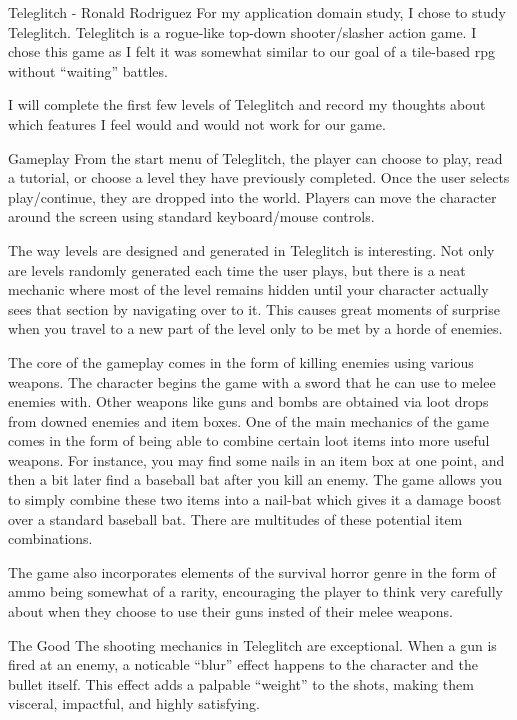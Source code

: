 \documentclass[12pt]{report}
\begin{document}
\begin{section}{Teleglitch - Ronald Rodriguez}
For my application domain study, I chose to study Teleglitch. Teleglitch 
is a rogue-like top-down shooter/slasher action game. I chose this game 
as I felt it was somewhat similar to our goal of a tile-based rpg without 
``waiting'' battles.

I will complete the first few levels of Teleglitch and record my thoughts 
about which features I feel would and would not work for our 
game. 

\begin{subsection}{Gameplay}
From the start menu of Teleglitch, the player can choose to play, read a 
tutorial, or choose a level they have previously completed. Once the 
user selects play/continue, they are dropped into the world. Players can
move  the character around the screen using standard keyboard/mouse
controls. 

The way levels are designed and generated in Teleglitch is interesting. Not
only are levels randomly generated each time the user plays, but there is a
neat mechanic where most of the level remains hidden until your character 
actually sees that section by navigating over to it. This causes great 
moments of surprise when you travel to a new part of the level only to be 
met by a horde of enemies. 

The core of the gameplay comes in the form of killing enemies using various
weapons. The character begins the game with a sword that he can use to
melee  enemies with. Other weapons like guns and bombs are obtained via
loot drops from downed enemies and item boxes. One of the main mechanics of
the game comes in the form of being able to combine certain loot items into
more useful weapons. For instance, you may find some nails in an item box
at one point, and then a bit later find a baseball bat after you kill an
enemy. The game allows you to simply combine these two items into a
nail-bat which gives it a damage boost over a standard baseball bat. There
are multitudes of these potential item combinations. 

The game also incorporates elements of the survival horror genre in the
form of ammo being somewhat of a rarity, encouraging the player to think
very carefully about when they choose to use their guns insted of their
melee weapons.
\end{subsection}

\begin{subsection}{The Good}
The shooting mechanics in Teleglitch are exceptional. When a gun is fired
at an enemy, a noticable ``blur'' effect happens to the character and the
bullet itself. This effect adds a palpable ``weight'' to the shots, making
them visceral, impactful, and highly satisfying. 


\end{subsection}
\end{section}
\end{document}
